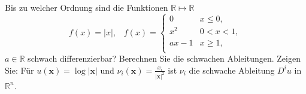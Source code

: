 Bis zu welcher Ordnung sind die Funktionen $\mathbb{R} \mapsto \mathbb{R}$
\begin{equation*}
    f(x) = |x|, \hspace{10pt} f(x) = 
    \begin{cases}
    0 & x \leq 0, \\
    x^2 & 0 < x < 1, \\
    ax - 1 & x \geq 1, \\
    \end{cases}
\end{equation*}
$a \in \mathbb{R}$ schwach differenzierbar? Berechnen Sie die schwachen Ableitungen.
Zeigen Sie: Für $u(\textbf{x}) = \log|\textbf{x}|$ und $\nu_i(\textbf{x}) = \frac{x_i}{|\textbf{x}|^2}$ ist $\nu_i$ die schwache Ableitung $D^iu$ in $\mathbb{R}^n$. 